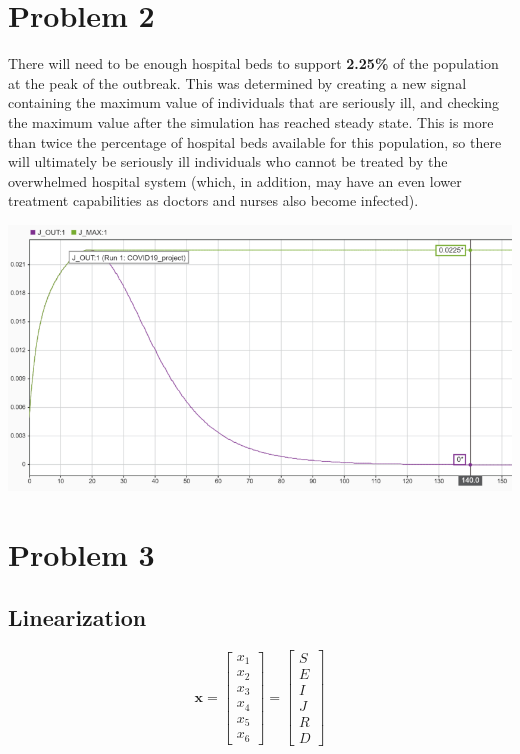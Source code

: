 \documentclass[fleqn]{article}
\begin{document}
\section*{Problem 2}
There will need to be enough hospital beds to support \textbf{2.25\%} of the population at the peak of the outbreak. This was determined by creating a new signal containing the maximum value of individuals that are seriously ill, and checking the maximum value after the simulation has reached steady state. This is more than twice the percentage of hospital beds available for this population, so there will ultimately be seriously ill individuals who cannot be treated by the overwhelmed hospital system (which, in addition, may have an even lower treatment capabilities as doctors and nurses also become infected).
\begin{center}
    \includegraphics[width=\linewidth]{simulink_J_max}
\end{center}

\newpage
\section*{Problem 3}
\subsection*{Linearization}
\begin{equation*}
    \bm{x} = \begin{bmatrix}
        x_1 \\
        x_2 \\
        x_3 \\
        x_4 \\
        x_5 \\
        x_6
    \end{bmatrix} = \begin{bmatrix}
        S \\
        E \\
        I \\
        J \\
        R \\
        D
    \end{bmatrix}
\end{equation*}
\end{document}
